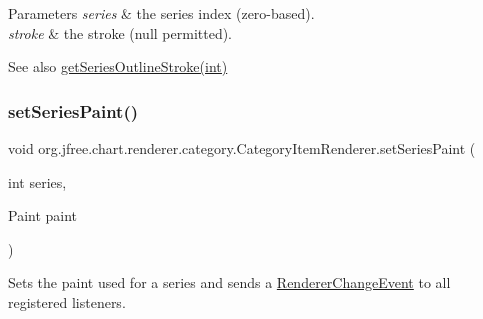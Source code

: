\begin{DoxyParams}{Parameters}
{\em series} & the series index (zero-\/based). \\
\hline
{\em stroke} & the stroke ({\ttfamily null} permitted).\\
\hline
\end{DoxyParams}
\begin{DoxySeeAlso}{See also}
\mbox{\hyperlink{interfaceorg_1_1jfree_1_1chart_1_1renderer_1_1category_1_1_category_item_renderer_af92cab3b28cb791e01ecfab7d562f3cb}{get\+Series\+Outline\+Stroke(int)}} 
\end{DoxySeeAlso}
\mbox{\label{interfaceorg_1_1jfree_1_1chart_1_1renderer_1_1category_1_1_category_item_renderer_a5e1be0451c25f554cca76cceaa5a3785}} 
\subsubsection{\texorpdfstring{set\+Series\+Paint()}{setSeriesPaint()}}
{\footnotesize\ttfamily void org.\+jfree.\+chart.\+renderer.\+category.\+Category\+Item\+Renderer.\+set\+Series\+Paint (\begin{DoxyParamCaption}\item[{int}]{series,  }\item[{Paint}]{paint }\end{DoxyParamCaption})}

Sets the paint used for a series and sends a \mbox{\hyperlink{}{Renderer\+Change\+Event}} to all registered listeners.


